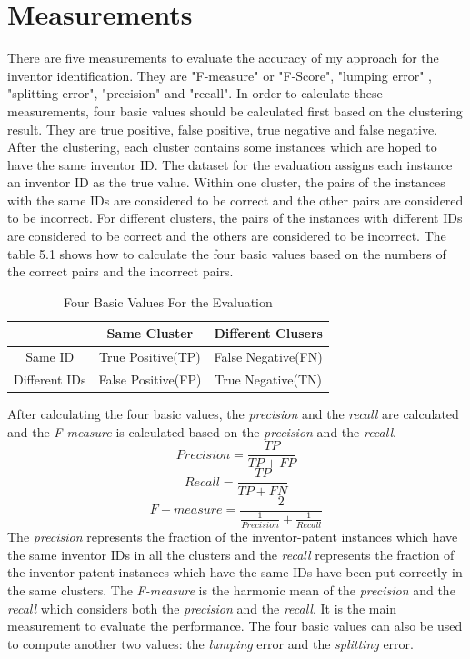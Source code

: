 \section{Measurements}
There are five measurements to evaluate the accuracy of my approach for the inventor identification. They are "F-measure" or "F-Score", "lumping error" , "splitting error", "precision" and "recall". In order to calculate these measurements, four basic values should be calculated first based on the clustering result. They are true positive, false positive, true negative and false negative.  After the clustering, each cluster contains some instances which are hoped to have the same inventor ID. The dataset for the evaluation assigns each instance an inventor ID as the true value.  Within one cluster, the pairs of the instances with the same IDs are considered to be correct and the other pairs are considered to be incorrect. For different clusters, the pairs of the instances with different IDs are considered to be correct and the others are considered to be incorrect. The table 5.1 shows how to calculate the four basic values based on the numbers of the correct pairs and the incorrect pairs.
\begin{table}
\centering
\begin{tabular}{|c|c|c|}
\hline
 & Same Cluster & Different Clusers \\
 \hline
 Same ID & True Positive(TP) & False Negative(FN)  \\
 \hline
Different IDs & False Positive(FP) & True Negative(TN) \\
\hline
\end{tabular}
\caption{Four Basic Values For the Evaluation}
\end{table}
After calculating the four basic values, the \emph{precision} and the \emph{recall} are calculated and the \emph{F-measure} is calculated based on the \emph{precision} and the \emph{recall}. 
\begin{equation}
Precision =\frac{TP}{TP+FP}
\end{equation} 
\begin{equation}
Recall =\frac{TP}{TP+FN}
\end{equation} 
\begin{equation}
F-measure= \frac{2}{\frac{1}{Precision}+\frac{1}{Recall}}
\end{equation}
The \emph{precision} represents the fraction of the inventor-patent instances which have the same inventor IDs in all the clusters and the \emph{recall} represents the fraction of the inventor-patent instances which have the same IDs have been put correctly in the same clusters. The \emph{F-measure} is the harmonic mean of the \emph{precision} and the \emph{recall} which considers both the \emph{precision} and the \emph{recall}. It is the main measurement to evaluate the performance.  The four basic values can also be used to compute another two values: the \emph{lumping} error and the \emph{splitting} error.
